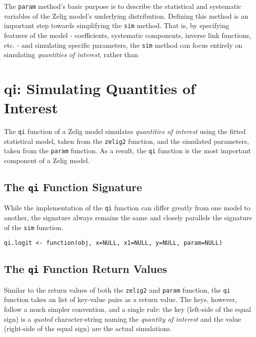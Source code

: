 \documentclass{article}
\newcommand{\code}[1]{{\tt #1}}
\begin{document}
The \code{param} method's basic purpose is to describe the statistical and systematic variables of the Zelig model's underlying distribution. Defining this method is an important step towards simplifying the \code{sim} method. That is, by specifying features of the model - coefficients, systematic components, inverse link functions, etc. - and simulating specific parameters, the \code{sim} method can focus entirely on simulating \emph{quantities of interest}, rather than
	




\section{qi: Simulating Quantities of Interest}

The \code{qi} function of a Zelig model simulates \emph{quantities of interest}
using the fitted statistical model, taken from the \code{zelig2} function,
and the simulated parameters, taken from the \code{param} function. As a result,
the \code{qi} function is the most important component of a Zelig model.

\subsection{The \code{qi} Function Signature}

While the implementation of the \code{qi} function can differ greatly from one
model to another, the signature always remains the same and closely parallels the 
signature of the \code{sim} function.


\begin{verbatim}
qi.logit <- function(obj, x=NULL, x1=NULL, y=NULL, param=NULL)
\end{verbatim}



\subsection{The \code{qi} Function Return Values}

Similar to the return values of both the \code{zelig2} and \code{param} function,
the \code{qi} function takes an list of key-value pairs as a return value. The keys,
however, follow a much simpler convention, and a single rule: the key (left-side
of the equal sign) is a \emph{quoted} character-string naming the \emph{quantity of
interest} and the value (right-side of the equal sign) are the actual simulations.
\end{document}
